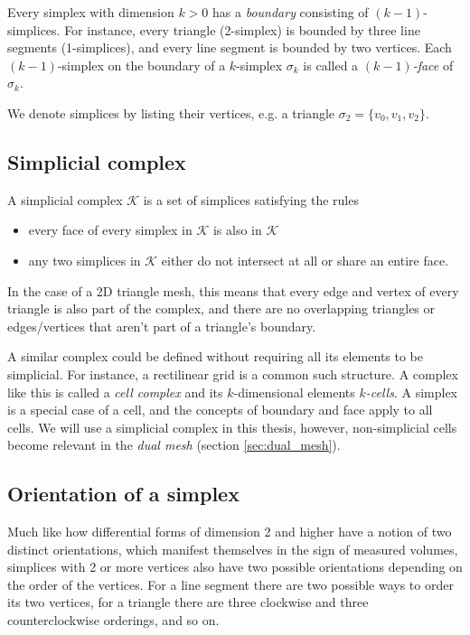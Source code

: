 \documentclass[utf8,english]{gradu3}
\begin{document}
Every simplex with dimension $k > 0$
has a \textit{boundary} consisting of $(k-1)$-simplices.
For instance, every triangle (2-simplex) is bounded by three line segments (1-simplices),
and every line segment is bounded by two vertices.
Each $(k-1)$-simplex on the boundary of a $k$-simplex $\sigma_k$
is called a \textit{$(k-1)$-face} of $\sigma_k$.

We denote simplices by listing their vertices, e.g. a triangle
$\sigma_2 = \{v_0, v_1, v_2\}$.


\subsection{Simplicial complex}

A simplicial complex $\mathcal{K}$ is a set of simplices satisfying the rules

\begin{itemize}
  \item every face of every simplex in $\mathcal{K}$ is also in $\mathcal{K}$
  \item any two simplices in $\mathcal{K}$ either do not intersect at all
    or share an entire face.
\end{itemize}

In the case of a 2D triangle mesh, this means
that every edge and vertex of every triangle is also part of the complex,
and there are no overlapping triangles
or edges/vertices that aren't part of a triangle's boundary.

A similar complex could be defined without requiring
all its elements to be simplicial.
For instance, a rectilinear grid is a common such structure.
A complex like this is called a \textit{cell complex}
and its $k$-dimensional elements \textit{$k$-cells}.
A simplex is a special case of a cell,
and the concepts of boundary and face apply to all cells.
We will use a simplicial complex in this thesis,
however, non-simplicial cells become relevant in the \textit{dual mesh}
(section \ref{sec:dual_mesh}).


\subsection{Orientation of a simplex}

Much like how differential forms of dimension 2 and higher
have a notion of two distinct orientations,
which manifest themselves in the sign of measured volumes,
simplices with 2 or more vertices also have two possible orientations
depending on the order of the vertices.
For a line segment there are two possible ways to order its two vertices,
for a triangle there are three clockwise and three counterclockwise orderings,
and so on.
\end{document}

